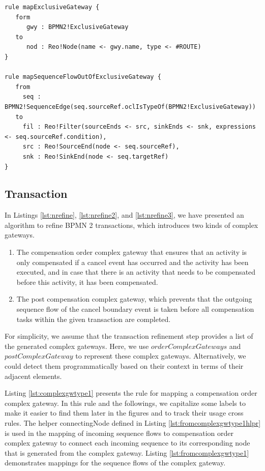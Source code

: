 \begin{lstlisting}[float,frame=single,caption=Mapping exclusive gateway,label=lst:gw1]
rule mapExclusiveGateway {
   form
      gwy : BPMN2!ExclusiveGateway
   to
      nod : Reo!Node(name <- gwy.name, type <- #ROUTE)
}

rule mapSequenceFlowOutOfExclusiveGateway {
   from
     seq : BPMN2!SequenceEdge(seq.sourceRef.oclIsTypeOf(BPMN2!ExclusiveGateway))
   to 
     fil : Reo!Filter(sourceEnds <- src, sinkEnds <- snk, expressions <- seq.sourceRef.condition),
     src : Reo!SourceEnd(node <- seq.sourceRef),
     snk : Reo!SinkEnd(node <- seq.targetRef)
}   
\end{lstlisting}

\subsection{Transaction}
In Listings \ref{lst:nrefine}, \ref{lst:nrefine2}, and \ref{lst:nrefine3}, we have presented an algorithm to refine BPMN 2 transactions, which introduces two kinds of {complex gateway}s.

\begin{enumerate}
 \item The compensation order complex gateway that ensures that an {activity} is only compensated if a {cancel event} has occurred and the {activity} has been executed, and in case that there is an {activity} that needs to be compensated before this {activity}, it has been compensated.     
 \item The post compensation complex gateway, which prevents that the outgoing sequence flow of the cancel boundary event is taken before all compensation tasks within the given transaction are completed.
\end{enumerate}

 For simplicity, we assume that the transaction refinement step provides a list of the generated complex gateways. Here, we use $orderComplexGateways$ and $postComplexGateway$ to represent these complex gateways. Alternatively, we could detect them programmatically based on their context in terms of their adjacent elements. 
 
 Listing \ref{lst:complexgwtype1} presents the rule for mapping a compensation order {complex gateway}. In this rule and the followings, we capitalize some labels to make it easier to find them later in the figures and to track their usage cross rules. The helper {connectingNode} defined in Listing \ref{lst:fromcomplexgwtype1hlpr} is used in the mapping of incoming sequence flows to compensation order {complex gateway} to connect each incoming sequence to its corresponding node that is generated from the complex gateway. Listing \ref{lst:fromcomplexgwtype1} demonstrates mappings for the sequence flows of the complex gateway.  
 
